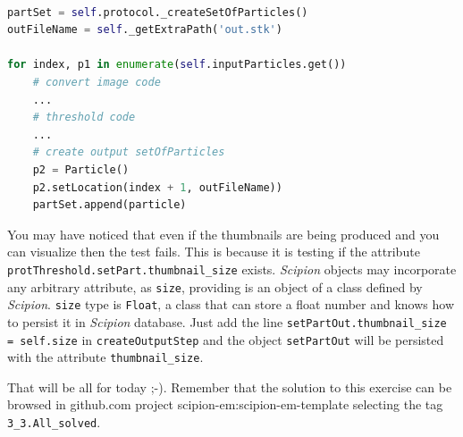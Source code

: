 \documentclass[12pt]{article} %
\def\scipion{\textit{Scipion}\xspace}
\newcommand{\ttt}[1]{\texttt{#1}}
\begin{document}
\begin{lstlisting}[language=Python,label={lst:setofParticles}, caption="Creating an output set of particles"]

partSet = self.protocol._createSetOfParticles()
outFileName = self._getExtraPath('out.stk')

for index, p1 in enumerate(self.inputParticles.get())
    # convert image code
    ...
    # threshold code
    ...
    # create output setOfParticles  
    p2 = Particle()
    p2.setLocation(index + 1, outFileName))
    partSet.append(particle)
\end{lstlisting}

You may have noticed that even if the thumbnails are being produced and you can visualize then the test fails. This is because it is testing if the attribute 
\ttt{protThreshold.setPart.thumbnail\_size} exists. \scipion objects may incorporate any arbitrary attribute, as \ttt{size}, providing is an object of a class defined by \scipion. \ttt{size} type is \ttt{Float}, a class that can store a float number and knows how to persist it in \scipion database. Just add the line \ttt{setPartOut.thumbnail\_size = self.size} in \ttt{createOutputStep}
and the object \ttt{setPartOut} will be persisted with the attribute \ttt{thumbnail\_size}.

That will be all for today ;-). Remember  that the solution to this exercise can be browsed in github.com project scipion-em:scipion-em-template selecting the tag \ttt{3\_3.All\_solved}.

%
%
\end{document}
